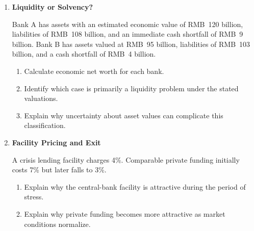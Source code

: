 \begin{enumerate}
\begin{enumerate}
\item Calculate the residual liquidity need.

\item Calculate the maximum borrowing capacity supported by the collateral.

\item Determine the amount the bank would need to borrow from the central bank to close the liquidity gap.

\item Calculate the unused borrowing capacity after the transaction.

\item Explain how a larger haircut would affect access to central-bank liquidity.

\end{enumerate}

\item \textbf{Liquidity or Solvency?}

Bank A has assets with an estimated economic value of RMB~120 billion, liabilities of RMB~108 billion, and an immediate cash shortfall of RMB~9 billion. Bank B has assets valued at RMB~95 billion, liabilities of RMB~103 billion, and a cash shortfall of RMB~4 billion.

\begin{enumerate}

\item Calculate economic net worth for each bank.

\item Identify which case is primarily a liquidity problem under the stated valuations.

\item Explain why uncertainty about asset values can complicate this classification.

\end{enumerate}

\item \textbf{Facility Pricing and Exit}

A crisis lending facility charges 4\%. Comparable private funding initially costs 7\% but later falls to 3\%.

\begin{enumerate}

\item Explain why the central-bank facility is attractive during the period of stress.

\item Explain why private funding becomes more attractive as market conditions normalize.


\end{enumerate}
\end{enumerate}
